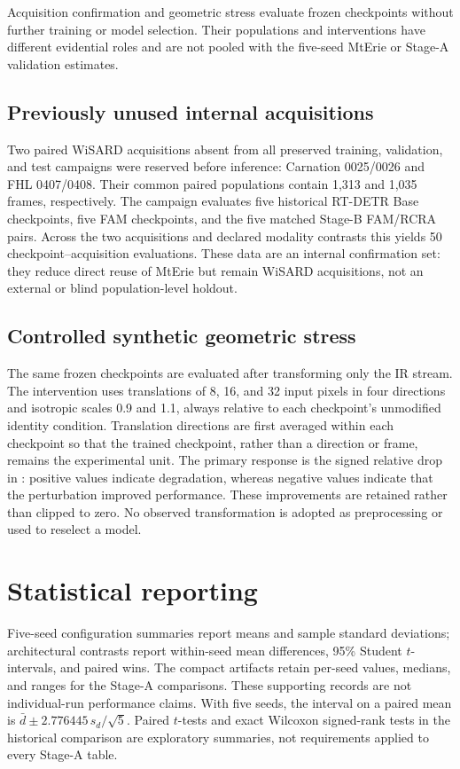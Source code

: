 Acquisition confirmation and geometric stress evaluate frozen checkpoints
without further training or model selection. Their populations and
interventions have different evidential roles and are not pooled with the
five-seed MtErie or Stage-A validation estimates.

\subsection{Previously unused internal acquisitions}

Two paired WiSARD acquisitions absent from all preserved training, validation,
and test campaigns were reserved before inference: Carnation 0025/0026 and FHL
0407/0408. Their common paired populations contain 1,313 and 1,035 frames,
respectively. The campaign evaluates five historical RT-DETR Base checkpoints,
five FAM checkpoints, and the five matched Stage-B FAM/RCRA pairs. Across
the two acquisitions and declared modality contrasts this yields 50
checkpoint--acquisition evaluations. These data are an internal confirmation
set: they reduce direct reuse of MtErie but remain WiSARD acquisitions, not an
external or blind population-level holdout.

\subsection{Controlled synthetic geometric stress}

The same frozen checkpoints are evaluated after transforming only the IR
stream. The intervention uses translations of 8, 16, and 32 input pixels in
four directions and isotropic scales 0.9 and 1.1, always relative to each
checkpoint's unmodified identity condition. Translation directions are first
averaged within each checkpoint so that the trained checkpoint, rather than a
direction or frame, remains the experimental unit. The primary response is the
signed relative drop in \mapfifty{}: positive values indicate degradation,
whereas negative values indicate that the perturbation improved performance.
These improvements are retained rather than clipped to zero. No observed
transformation is adopted as preprocessing or used to reselect a model.

\section{Statistical reporting}

Five-seed configuration summaries report means and sample standard deviations;
architectural contrasts report within-seed mean differences, 95\% Student
\(t\)-intervals, and paired wins. The compact artifacts retain per-seed values,
medians, and ranges for the Stage-A comparisons. These supporting records are
not individual-run performance claims. With five seeds, the interval on a
paired mean is \(\bar d \pm 2.776445\,s_d/\sqrt{5}\).
Paired \(t\)-tests and exact Wilcoxon signed-rank tests in the historical
comparison are exploratory summaries, not requirements applied to every
Stage-A table.

